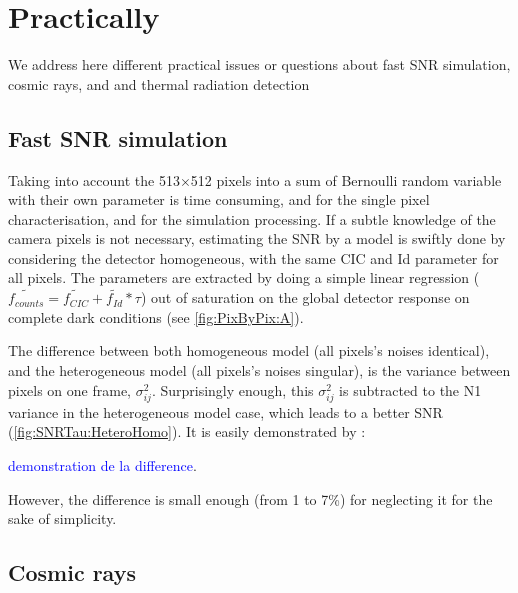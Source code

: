 
\section{Practically}

We address here different practical issues or questions about fast SNR simulation, cosmic rays, and and thermal radiation detection

\subsection{Fast SNR simulation}

Taking into account the 513$\times$512 pixels into a sum of Bernoulli random variable with their own parameter is time consuming, and for the single pixel characterisation, and for the simulation processing. 
If a subtle knowledge of the camera pixels is not necessary, estimating the SNR by a model is swiftly done by considering the detector homogeneous, with the same CIC and Id parameter for all pixels. The parameters are extracted by doing a simple linear regression ($\tilde{f_{counts}} = \tilde{f_{CIC}} + \tilde{f_{Id}}*\tau$) out of saturation on the global detector response on complete dark conditions (see \ref{fig:PixByPix:A}).\par
The difference between both homogeneous model (all pixels's noises identical), and the heterogeneous model (all pixels's noises singular), is the variance between pixels on one frame, $\sigma^2_{ij}$. Surprisingly enough, this $\sigma^2_{ij}$ is subtracted to the N1 variance in the heterogeneous model case, which leads to a better SNR (\ref{fig:SNRTau:HeteroHomo}). 
It is easily demonstrated by :   \par

\textcolor{blue}{demonstration de la difference}.\par
\medskip
However, the difference is small enough (from 1 to 7\%) for neglecting it for the sake of simplicity. 
%
	
\subsection{Cosmic rays}

